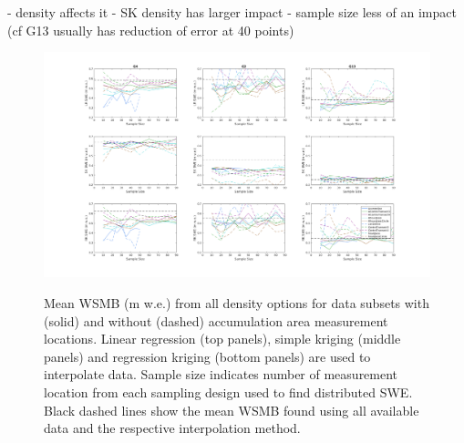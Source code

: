 \documentclass[12pt]{article}
\begin{document}
- density affects it
- SK density has larger impact 
- sample size less of an impact (cf G13 usually has reduction of error at 40 points)



\pagebreak
\begin{landscape}
\begin{figure}[H]
	\centering
	\includegraphics[height =0.9\textwidth]{SubsetInterpSizeCompile_SWE.png}\\
	\caption{Mean WSMB (m w.e.) from all density options for data subsets with (solid) and without (dashed) accumulation area measurement locations. Linear regression (top panels), simple kriging (middle panels) and regression kriging (bottom panels) are used to interpolate data. Sample size indicates number of measurement location from each sampling design used to find distributed SWE. Black dashed lines show the mean WSMB found using all available data and the respective interpolation method.  }
	\label{fig:SubsetInterpSizeCompile_SWE}
\end{figure}


\end{landscape}
\end{document}
